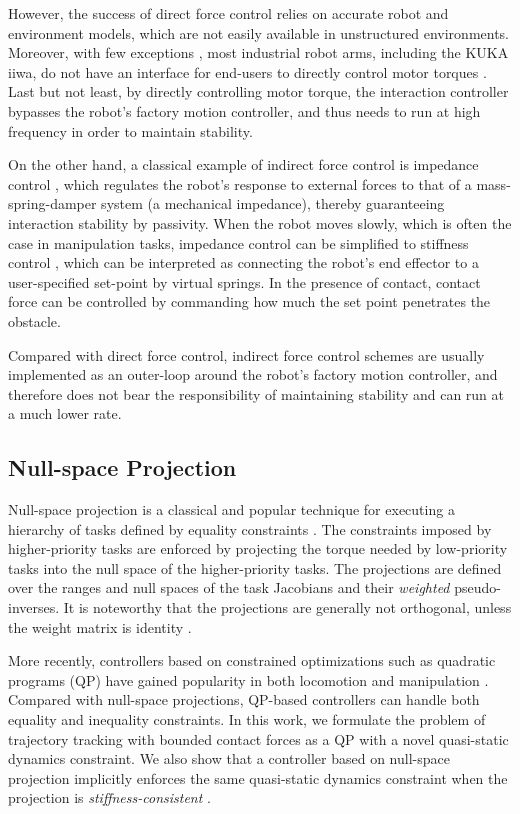 However, the success of direct force control relies on accurate robot and environment models, which are not easily available in unstructured environments. Moreover, with few exceptions \cite{franka}, most industrial robot arms, including the KUKA iiwa, do not have an interface for end-users to directly control motor torques \cite{kuka2019fri}. Last but not least, by directly controlling motor torque, the interaction controller bypasses the robot's factory motion controller, and thus needs to run at high frequency in order to maintain stability.

On the other hand, a classical example of indirect force control is impedance control \cite{hogan1984impedance}, which regulates the robot's response to external forces to that of a mass-spring-damper system (a mechanical impedance), thereby guaranteeing interaction stability by passivity. When the robot moves slowly, which is often the case in manipulation tasks, impedance control can be simplified to stiffness control \cite{salisbury1980active}, which can be interpreted as connecting the robot's end effector to a user-specified set-point by virtual springs. In the presence of contact, contact force can be controlled by commanding how much the set point penetrates the obstacle.

Compared with direct force control, indirect force control schemes are usually implemented as an outer-loop around the robot's factory motion controller, and therefore does not bear the responsibility of maintaining stability and can run at a much lower rate.


\subsection{Null-space Projection}
Null-space projection is a classical and popular technique for executing a hierarchy of tasks defined by equality constraints \cite{nakamura1987task, siciliano1991general, aghili2005unified, dehio2018modeling, jorda2019contact}. The constraints imposed by higher-priority tasks are enforced by projecting the torque needed by low-priority tasks into the null space of the higher-priority tasks. The projections are defined over the ranges and null spaces of the task Jacobians and their \textit{weighted} pseudo-inverses. It is noteworthy that the projections are generally not orthogonal, unless the weight matrix is identity \cite{dietrich2015overview}.

More recently, controllers based on constrained optimizations such as quadratic programs (QP) have gained popularity in both locomotion \cite{koolen2016design, kuindersma2014efficiently} and manipulation \cite{jain2013manipulation}. Compared with null-space projections, QP-based controllers can handle both equality and inequality constraints. In this work, we formulate the problem of trajectory tracking with bounded contact forces as a QP with a novel quasi-static dynamics constraint. We also show that a controller based on null-space projection implicitly enforces the same quasi-static dynamics constraint when the projection is \textit{stiffness-consistent} \cite{dietrich2015overview}.


